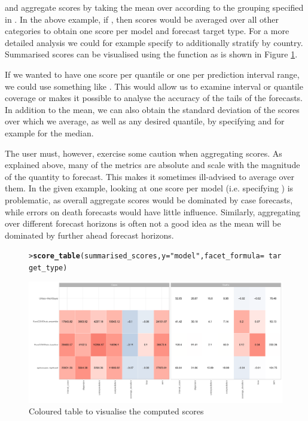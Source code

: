 \documentclass[article,shortnames]{jss}\usepackage[]{graphicx}\usepackage[]{color}
\makeatletter
\def\maxwidth{ %
  \ifdim\Gin@nat@width>\linewidth
    \linewidth
  \else
    \Gin@nat@width
  \fi
}
\newcommand{\hlstr}[1]{\textcolor[rgb]{0.192,0.494,0.8}{#1}}%
\newcommand{\hlopt}[1]{\textcolor[rgb]{0,0,0}{#1}}%
\newcommand{\hlstd}[1]{\textcolor[rgb]{0.345,0.345,0.345}{#1}}%
\newcommand{\hlkwc}[1]{\textcolor[rgb]{0.333,0.667,0.333}{#1}}%
\newcommand{\hlkwd}[1]{\textcolor[rgb]{0.737,0.353,0.396}{\textbf{#1}}}%
\newenvironment{kframe}{%
 \def\at@end@of@kframe{}%
 \ifinner\ifhmode%
  \def\at@end@of@kframe{\end{minipage}}%
  \begin{minipage}{\columnwidth}%
 \fi\fi%
 \def\FrameCommand##1{\hskip\@totalleftmargin \hskip-\fboxsep
 \colorbox{shadecolor}{##1}\hskip-\fboxsep
     \hskip-\linewidth \hskip-\@totalleftmargin \hskip\columnwidth}%
 \MakeFramed {\advance\hsize-\width
   \@totalleftmargin\z@ \linewidth\hsize
   \@setminipage}}%
 {\par\unskip\endMakeFramed%
 \at@end@of@kframe}
\newenvironment{knitrout}{}{} %
\newcommand{\fct}[1]{\code{#1()}}
\makeatother
\begin{document}
% 
\fct{eval\_forecasts} and \fct{summarise\_scores} aggregate scores by taking the mean over according to the grouping specified in . In the above example, if , then scores would be averaged over all other categories to obtain one score per model and forecast target type. For a more detailed analysis we could for example specify  to additionally stratify by country. Summarised scores can be visualised using the function \fct{scores\_table} as is shown in Figure \ref{fig:score-table}. 

If we wanted to have one score per quantile or one per prediction interval range, we could use something like . This would allow us to examine interval or quantile coverage or makes it possible to analyse the accuracy of the tails of the forecasts. In addition to the mean, we can also obtain the standard deviation of the scores over which we average, as well as any desired quantile, by specifying  and for example  for the median. 

The user must, however, exercise some caution when aggregating scores. As explained above, many of the metrics are absolute and scale with the magnitude of the quantity to forecast. This makes it sometimes ill-advised to average over them. In the given example, looking at one score per model (i.e. specifying ) is problematic, as overall aggregate scores would be dominated by case forecasts, while errors on death forecasts would have little influence. Similarly, aggregating over different forecast horizons is often not a good idea as the mean will be dominated by further ahead forecast horizons. 

\begin{figure}[h]
\centering
\begin{knitrout}
\color{fgcolor}\begin{kframe}
\begin{alltt}
\hlstd{> }\hlkwd{score_table}\hlstd{(summarised_scores,} \hlkwc{y} \hlstd{=} \hlstr{"model"}\hlstd{,} \hlkwc{facet_formula} \hlstd{=} \hlopt{~}\hlstd{target_type)}
\end{alltt}
\end{kframe}
\includegraphics[width=\maxwidth]{plots/plot-score-table-1} 
\end{knitrout}
\caption{\label{fig:score-table} Coloured table to visualise the computed scores}
\end{figure}
\end{document}
